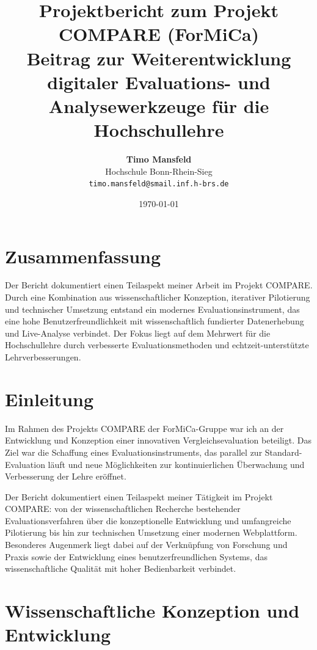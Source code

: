 \documentclass[12pt,a4paper,oneside]{article}
\title{
    \textbf{Projektbericht zum Projekt COMPARE (ForMiCa)}\\
    \vspace{0.5cm}
    {\large Beitrag zur Weiterentwicklung digitaler Evaluations- und Analysewerkzeuge für die Hochschullehre}
}
\author{
    \textbf{Timo Mansfeld}\\
    Hochschule Bonn-Rhein-Sieg\\
    \texttt{timo.mansfeld@smail.inf.h-brs.de}
}
\date{\today}
\renewenvironment{abstract}{%
    \section*{Zusammenfassung}
    \small
}{%
    \normalsize
}
\begin{document}
\maketitle

\begin{abstract}
    Der Bericht dokumentiert einen Teilaspekt meiner Arbeit im Projekt COMPARE. Durch eine Kombination aus wissenschaftlicher Konzeption, iterativer Pilotierung und technischer Umsetzung entstand ein modernes Evaluationsinstrument, das eine hohe Benutzerfreundlichkeit mit wissenschaftlich fundierter Datenerhebung und Live-Analyse verbindet. Der Fokus liegt auf dem Mehrwert für die Hochschullehre durch verbesserte Evaluationsmethoden und echtzeit-unterstützte Lehrverbesserungen.
\end{abstract}


\newpage
\tableofcontents
\newpage


\section{Einleitung}

Im Rahmen des Projekts COMPARE der ForMiCa-Gruppe war ich an der Entwicklung und Konzeption einer innovativen Vergleichsevaluation beteiligt. Das Ziel war die Schaffung eines Evaluationsinstruments, das parallel zur Standard-Evaluation läuft und neue Möglichkeiten zur kontinuierlichen Überwachung und Verbesserung der Lehre eröffnet.

Der Bericht dokumentiert einen Teilaspekt meiner Tätigkeit im Projekt COMPARE: von der wissenschaftlichen Recherche bestehender Evaluationsverfahren über die konzeptionelle Entwicklung und umfangreiche Pilotierung bis hin zur technischen Umsetzung einer modernen Webplattform. Besonderes Augenmerk liegt dabei auf der Verknüpfung von Forschung und Praxis sowie der Entwicklung eines benutzerfreundlichen Systems, das wissenschaftliche Qualität mit hoher Bedienbarkeit verbindet.

\section{Wissenschaftliche Konzeption und Entwicklung}
\end{document}
